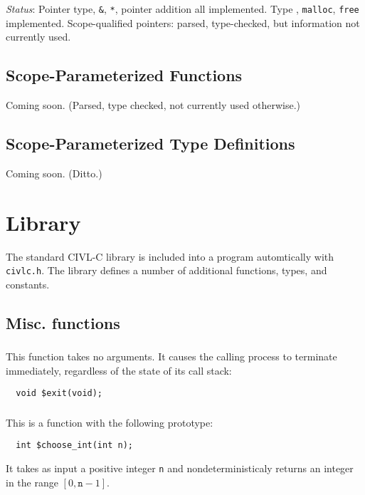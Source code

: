 \emph{Status}: Pointer type, \texttt{\&}, \texttt{*}, pointer addition
all implemented.  Type \cheap{}, \texttt{malloc}, \texttt{free}
implemented.  Scope-qualified pointers: parsed, type-checked, but
information not currently used.

\section{Scope-Parameterized Functions}

Coming soon.  (Parsed, type checked, not currently used otherwise.)

\section{Scope-Parameterized Type Definitions}

Coming soon. (Ditto.)

\chapter{Library}

The standard CIVL-C library is included into a program automtically
with \texttt{civlc.h}.  The library defines a number of additional
functions, types, and constants.

\section{Misc. functions}

\subsection{\cexit} This function takes no arguments.  It causes the
calling process to terminate immediately, regardless of the state of
its call stack:
\begin{verbatim}
  void $exit(void);
\end{verbatim}

\subsection{\cchooseint} This is a function with the following
prototype:
\begin{verbatim}
  int $choose_int(int n);
\end{verbatim}
It takes as input a positive integer \texttt{n} and
nondeterministicaly returns an integer in the range
$[0,\texttt{n}-1]$.



